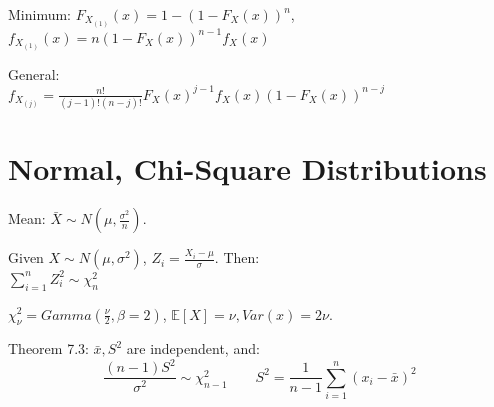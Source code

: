 \documentclass[10pt]{article}
\begin{document}
Minimum:
$F_{X_{(1)}}(x) = 1 - (1 - F_X(x))^n$, \\
$f_{X_{(1)}}(x) = n (1 - F_X(x)) ^ {n-1} f_X(x)$

General:\\
$f_{X_{(j)}} = \frac{n!}{(j-1)!(n-j)!}F_X(x)^{j-1}f_X(x)(1-F_X(x))^{n-j}$


\section{Normal, Chi-Square Distributions}
Mean: $\bar{X} \sim N(\mu, \frac{\sigma^2}{n})$.

Given $X \sim N(\mu, \sigma^2)$, $Z_i = \frac{X_i - \mu}{\sigma}$. Then:\\
$\sum_{i=1}^n Z_i^2 \sim \chi^2_n$

$\chi^2_\nu = Gamma(\frac{\nu}{2}, \beta=2)$, $\mathbb{E}[X] = \nu, Var(x) = 2\nu$.

Theorem 7.3: $\bar{x}, S^2$ are independent, and:
$$\frac{(n - 1)S^2}{\sigma^2} \sim \chi^2_{n-1} \quad \quad S^2 = \frac{1}{n-1} \sum_{i=1}^n (x_i - \bar{x})^2$$
\end{document}
